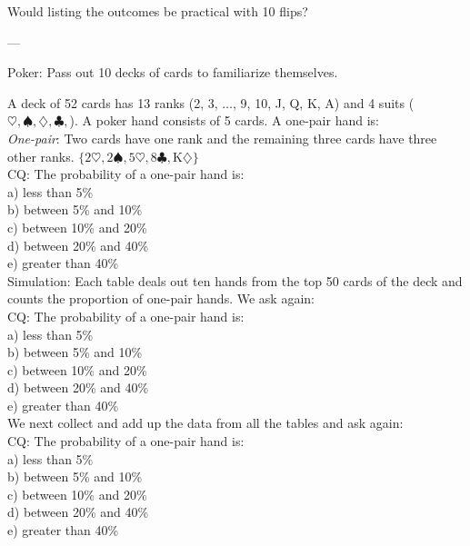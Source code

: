 \documentclass[12pt]{article}
\begin{document}
Would listing the outcomes be practical with 10 flips?

---

Poker: Pass out 10 decks of cards to familiarize themselves.

A deck of 52 cards has 13 ranks (2, 3, $\dots$, 9, 10, J, Q, K, A) and 4 suits ($\heartsuit,  \spadesuit, \diamondsuit, \clubsuit,$). A poker hand consists of 5 cards.  A one-pair hand is:\\
{\em One-pair}: Two cards have one rank and the remaining three cards have three other ranks. $\{2 \heartsuit, 2 \spadesuit, 5 \heartsuit, 8 \clubsuit, \text{K} \diamondsuit\}$ \\

CQ: The probability of a one-pair hand is: \\
a) less than 5\% \\
b) between 5\% and 10\% \\
c) between 10\% and 20\%\\
d) between 20\% and 40\% \\
e) greater than 40\% \\

Simulation: Each table deals out ten hands from the top 50 cards of the deck and counts the proportion of one-pair hands.  We ask again: \\

CQ: The probability of a one-pair hand is: \\
a) less than 5\% \\
b) between 5\% and 10\% \\
c) between 10\% and 20\%\\
d) between 20\% and 40\% \\
e) greater than 40\% \\

We next collect and add up the data from all the tables and ask again: \\

CQ: The probability of a one-pair hand is: \\
a) less than 5\% \\
b) between 5\% and 10\% \\
c) between 10\% and 20\%\\
d) between 20\% and 40\% \\
e) greater than 40\% \\

\end{document}
